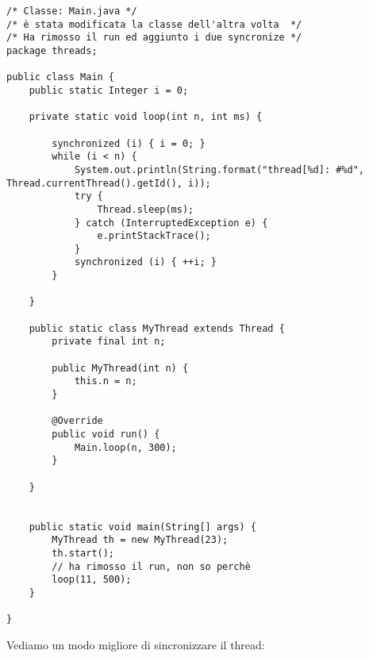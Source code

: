  
\begin{lstlisting}[basicstyle=\small,]
/* Classe: Main.java */
/* è stata modificata la classe dell'altra volta  */
/* Ha rimosso il run ed aggiunto i due syncronize */
package threads;

public class Main {
    public static Integer i = 0;

    private static void loop(int n, int ms) {

        synchronized (i) { i = 0; }
        while (i < n) {
            System.out.println(String.format("thread[%d]: #%d", Thread.currentThread().getId(), i));
            try {
                Thread.sleep(ms);
            } catch (InterruptedException e) {
                e.printStackTrace();
            }
            synchronized (i) { ++i; }
        }

    }

    public static class MyThread extends Thread {
        private final int n;

        public MyThread(int n) {
            this.n = n;
        }

        @Override
        public void run() {
            Main.loop(n, 300);
        }

    }


    public static void main(String[] args) {
        MyThread th = new MyThread(23);
        th.start();
        // ha rimosso il run, non so perchè
        loop(11, 500);
    }

}
\end{lstlisting}

\noindent Vediamo un modo migliore di sincronizzare il thread:

